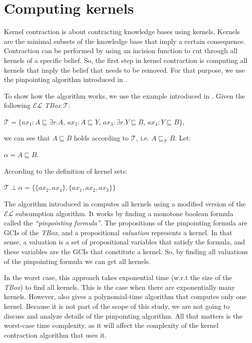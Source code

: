 \section{Computing kernels}
Kernel contraction is about contracting knowledge bases using kernels. Kernels are the minimal subsets of the knowledge base that imply a certain consequence. Contraction can be performed by using an incision function to cut through all kernels of a specific belief. So, the first step in kernel contraction is computing all kernels that imply the belief that needs to be removed. For that purpose, we use the pinpointing algorithm introduced in \cite{pin}.

To show how the algorithm works, we use the example introduced in \cite{pin}. Given the following $\mathcal{EL}$ \textit{TBox} $\mathcal{T}$:
\begin{center}
$\mathcal{T} = \lbrace ax_1: A \sqsubseteq \exists{r}.A$, \hspace{7pt}  $ax_2: A \sqsubseteq Y$,  \hspace{7pt} $ax_3: \exists{r}.Y \sqsubseteq B$, \hspace{7pt} $ax_4: Y \sqsubseteq B \rbrace$,
\end{center}
we can see that $A \sqsubseteq B$ holds according to $\mathcal{T}$, i.e. $A \sqsubseteq_{\mathcal{T}} B$. Let: 
\begin{center} 
$\alpha = A \sqsubseteq B$.
\end{center}
According to the definition of kernel sets:
\begin{center}
$\mathcal{T} \perp \alpha = \lbrace \lbrace ax_2, ax_4 \rbrace, \lbrace ax_1, ax_2, ax_3 \rbrace \rbrace$
\end{center}
The algorithm introduced in \cite{pin} computes all kernels using a modified version of the $\mathcal{EL}$ subsumption algorithm. It works by finding a monotone boolean formula called the \textit{``pinpointing formula''}. The propositions of the pinpointing formula are GCIs of the \textit{TBox}, and a propositional \textit{valuation} represents a kernel. In that sense, a valuation is a set of propositional variables that satisfy the formula, and these variables are the GCIs that constitute a kernel. So, by finding all valuations of the pinpointing formula we can get all kernels.

In the worst case, this approach takes exponential time (w.r.t the size of the \textit{TBox}) to find all kernels. This is the case when there are exponentially many kernels. However, \cite{pin} also gives a polynomial-time algorithm that computes only one kernel. Because it is not part of the scope of this study, we are not going to discuss and analyze details of the pinpointing algorithm. All that matters is the worst-case time complexity, as it will affect the complexity of the kernel contraction algorithm that uses it.


